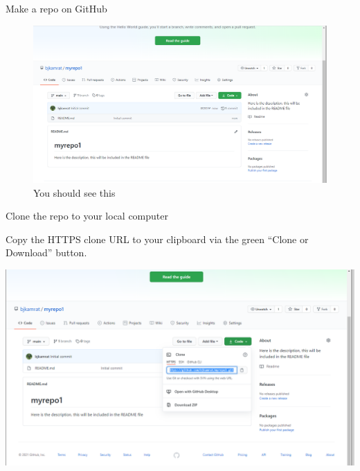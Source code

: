\documentclass[
  ignorenonframetext,
]{beamer}
\begin{document}
\begin{frame}{Make a repo on GitHub}
\protect\hypertarget{make-a-repo-on-github-2}{}

\begin{figure}
\centering
\includegraphics{pres_figs/new_repo_mainpage.png}
\caption{You should see this}
\end{figure}

\end{frame}

\begin{frame}{Clone the repo to your local computer}
\protect\hypertarget{clone-the-repo-to-your-local-computer}{}

Copy the HTTPS clone URL to your clipboard via the green ``Clone or
Download'' button.

\includegraphics{pres_figs/clone.png}

\end{frame}
\end{document}

